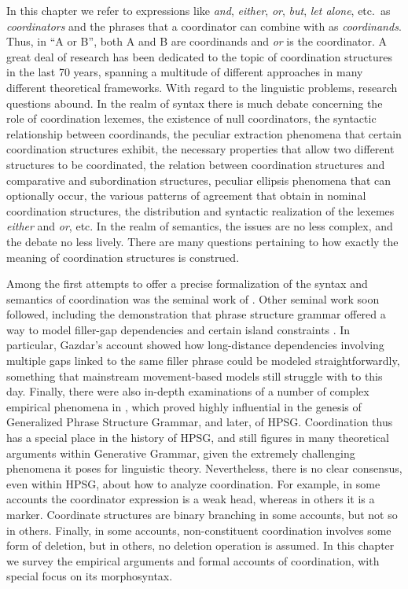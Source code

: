 In this chapter we refer to expressions like \emph{and}, \emph{either},  \emph{or}, \emph{but}, 
\emph{let alone}, etc.\ as \emph{coordinators} and the phrases that a coordinator can combine with as  \emph{coordinands}.
Thus,  in ``A or B'', both A and B are coordinands and \emph{or} is the coordinator. 
A great deal of research has been dedicated to the topic of coordination structures in the last  70 years, spanning a multitude of different approaches in many different theoretical frameworks.  With regard to the linguistic problems, research questions abound. In the realm of syntax there is much debate concerning the role of coordination lexemes, the existence of null coordinators, the syntactic relationship between coordinands, the peculiar extraction phenomena that certain coordination structures exhibit, the necessary properties that allow two different structures to be coordinated, the relation between coordination structures and comparative and subordination structures, peculiar ellipsis phenomena that can optionally occur, the various patterns of agreement that obtain in nominal coordination structures, the distribution and syntactic realization of the lexemes \emph{either} and \emph{or}, etc. In the realm of semantics, the issues are no less complex, and the debate no less lively. There are many questions pertaining to how exactly the meaning of coordination structures is construed. 

Among the first attempts to offer a precise formalization of the syntax and semantics of coordination was the seminal work of \citet{gazdarc}. Other seminal work soon followed, including the demonstration that phrase structure grammar offered a way to model filler-gap dependencies and certain island constraints \citep{gazdar}. In particular, Gazdar's account showed how long-distance dependencies involving multiple gaps linked to the same filler phrase could be modeled straightforwardly, something that mainstream movement-based models still struggle with to this day. Finally, there were also 
 in-depth examinations of a number of complex empirical phenomena in  \citet{gazd1982}, which  proved highly influential in the genesis of Generalized Phrase Structure Grammar, and later, of HPSG. Coordination thus has a special place in the history of HPSG, and still figures  in many theoretical arguments within Generative Grammar,  given the extremely challenging phenomena it poses for linguistic theory. 
Nevertheless, there is no clear consensus, even within HPSG, about how to analyze coordination. For example, in some accounts the coordinator
expression is a weak head, whereas in others it is a marker. Coordinate structures are binary branching in some accounts, but not so in others. Finally, in  some accounts, non-constituent coordination involves some form of deletion, but in others, no deletion operation is assumed.  
In this chapter we survey the empirical arguments and formal accounts of coordination, with special focus on its morphosyntax.

